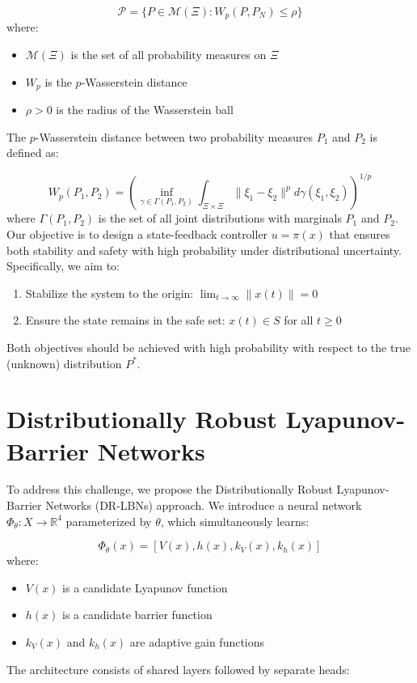 \documentclass[11pt, oneside]{article}
\begin{document}
\begin{equation}
    \mathcal{P} = \{P \in \mathcal{M}(\Xi) : W_p(P, P_N) \leq \rho\}
\end{equation}
%
where:
\begin{itemize}
    \item $\mathcal{M}(\Xi)$ is the set of all probability measures on $\Xi$
    \item $W_p$ is the $p$-Wasserstein distance
    \item $\rho > 0$ is the radius of the Wasserstein ball
\end{itemize}

The $p$-Wasserstein distance between two probability measures $P_1$ and $P_2$ is defined as:

\begin{equation}
    W_p(P_1, P_2) = \left(\inf_{\gamma \in \Gamma(P_1, P_2)} \int_{\Xi \times \Xi} \|\xi_1 - \xi_2\|^p d\gamma(\xi_1, \xi_2)\right)^{1/p}
\end{equation}
%
where $\Gamma(P_1, P_2)$ is the set of all joint distributions with marginals $P_1$ and $P_2$. Our objective is to design a state-feedback controller $u = \pi(x)$ that ensures both stability and safety with high probability under distributional uncertainty. Specifically, we aim to:

\begin{enumerate}

\item  Stabilize the system to the origin: $\lim_{t \to \infty} \|x(t)\| = 0$


\item Ensure the state remains in the safe set: $x(t) \in S$ for all $t \geq 0$

\end{enumerate}
%
Both objectives should be achieved with high probability with respect to the true (unknown) distribution $P^*$.

\section{Distributionally Robust Lyapunov-Barrier Networks}

To address this challenge, we propose the Distributionally Robust Lyapunov-Barrier Networks (DR-LBNs) approach. We introduce a neural network $\Phi_\theta : X \to \mathbb{R}^4$ parameterized by $\theta$, which simultaneously learns:

\begin{equation}
    \Phi_\theta(x) = [V(x), h(x), k_V(x), k_h(x)]
\end{equation}
%
where:
\begin{itemize}
    \item $V(x)$ is a candidate Lyapunov function
    \item $h(x)$ is a candidate barrier function
    \item $k_V(x)$ and $k_h(x)$ are adaptive gain functions
\end{itemize}
%
The architecture consists of shared layers followed by separate heads:
\end{document}
